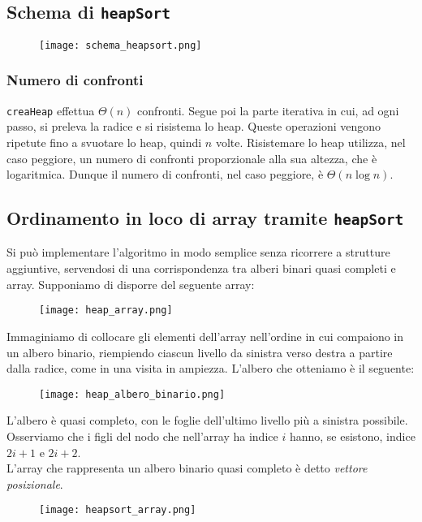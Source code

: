 \subsection{Schema di \texttt{heapSort}}
\begin{figure}[h]
    \texttt{[image: schema\_heapsort.png]}
\end{figure}

\subsubsection*{Numero di confronti}
\texttt{creaHeap} effettua $\Theta(n)$ confronti. Segue poi la parte iterativa in cui,
ad ogni passo, si preleva la radice e si risistema lo heap. Queste operazioni vengono ripetute
fino a svuotare lo heap, quindi $n$ volte. Risistemare lo heap utilizza, nel caso peggiore, un numero
di confronti proporzionale alla sua altezza, che è logaritmica. Dunque il numero
di confronti, nel caso peggiore, è $\Theta(n\log n)$.
\clearpage

\subsection{Ordinamento in loco di array tramite \texttt{heapSort}}
Si può implementare l'algoritmo in modo semplice senza ricorrere a strutture aggiuntive, servendosi
di una corrispondenza tra alberi binari quasi completi e array. Supponiamo di disporre del seguente array:

\begin{figure}[h]
    \texttt{[image: heap\_array.png]}
\end{figure}

\noindent Immaginiamo di collocare gli elementi dell'array nell'ordine in cui compaiono 
in un albero binario, riempiendo ciascun livello da sinistra verso destra a partire 
dalla radice, come in una visita in ampiezza. L'albero che otteniamo è il seguente:

\begin{figure}[h]
    \texttt{[image: heap\_albero\_binario.png]}
\end{figure}

L'albero è quasi completo, con le foglie dell'ultimo livello più a sinistra possibile.\\
Osserviamo che i figli del nodo che nell'array ha indice $i$ hanno, se esistono, indice
$2i + 1$ e $2i + 2$.\\
L'array che rappresenta un albero binario quasi completo è detto \emph{vettore posizionale}.\\
\begin{figure}[h]
    \texttt{[image: heapsort\_array.png]}
\end{figure}

